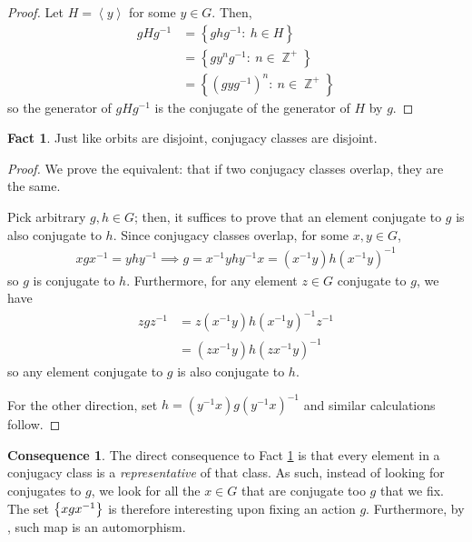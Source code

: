 \documentclass[11pt]{amsart} %
\theoremstyle{definition}
\newtheorem{fact}[definition]{Fact}
\newtheorem{consequence}[definition]{Consequence}
\theoremstyle{definition}
\DeclareMathOperator{\Z}{\mathbb{Z}}
\numberwithin{equation}{section}
\newcommand{\condset}[4]{\left\{ #1  : \: #2 #3 #4 \right\}}
\newcommand{\cyclic}[1]{\left\langle #1 \right\rangle}
\begin{document}
\begin{proof}
	Let $H = \cyclic{y}$ for some $y \in G$. Then,
	\begin{align*}
	gHg^{-1} &= \condset{ghg^{-1}}{h}{\in}{H} \\
	&=  \condset{g y^n g^{-1}}{n}{\in}{\Z^+} \\
	&= \condset{(g y g^{-1})^n}{n}{\in}{\Z^+} 
	\end{align*}
	so the generator of $gHg^{-1}$ is the conjugate of the generator of $H$ by $g$.
\end{proof}

\begin{fact}
	\label{factconjugacyclassesaredisjoint}
	Just like orbits are disjoint, conjugacy classes are disjoint.
\end{fact}

\begin{proof}
	We prove the equivalent: that if two conjugacy classes overlap, they are the same.
	
	Pick arbitrary $g,h \in G$; then, it suffices to prove that an element conjugate to $g$ is also conjugate to $h$. Since conjugacy classes overlap, for some $x,y \in G$,
	\begin{align*}
	xgx^{-1} = yhy^{-1} \implies g = x^{-1} y h y^{-1} x = (x^{-1} y) h (x^{-1} y)^{-1}
	\end{align*} 
	so $g$ is conjugate to $h$. Furthermore, for any element $z \in G$ conjugate to $g$, we have
	\begin{align*}
	zgz^{-1} &= z (x^{-1} y) h (x^{-1} y)^{-1} z^{-1} \\
	&= (z x^{-1} y) h (z x^{-1} y)^{-1}
 	\end{align*}
 	so any element conjugate to $g$ is also conjugate to $h$.
 	
 	For the other direction, set $h = (y^{-1} x) g (y^{-1} x)^{-1}$ and similar calculations follow.
\end{proof}


\begin{consequence}
	The direct consequence to Fact \ref{factconjugacyclassesaredisjoint} is that every element in a conjugacy class is a \textit{representative} of that class. As such, instead of looking for conjugates to $g$, we look for all the $x \in G$ that are conjugate too $g$ that we fix. The set $\set{xgx^{-1}}$ is therefore interesting upon fixing an action $g$. Furthermore, by , such map is an automorphism.
\end{consequence}
\end{document}
